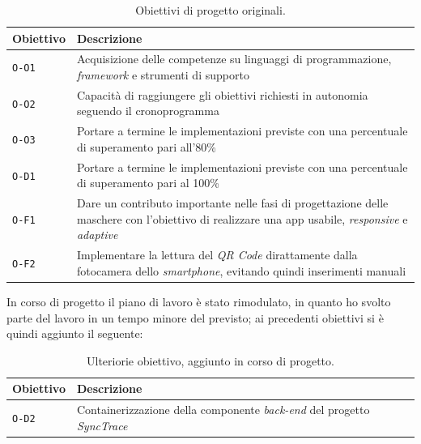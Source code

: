 \begin{table}[h]
\begin{tabularx}{\textwidth}{|l|X|}
\hline
\textbf{Obiettivo}           & \textbf{Descrizione}                                                                                                                          \\ \hline
\texttt{O-O1} & Acquisizione delle competenze su linguaggi di programmazione, \textit{framework} e strumenti di supporto                                              \\ \hline
\texttt{O-O2} & Capacità di raggiungere gli obiettivi richiesti in autonomia seguendo il cronoprogramma                                                       \\ \hline
\texttt{O-O3} & Portare a termine le implementazioni previste con una percentuale di superamento pari all'80\%                                                \\ \hline
\texttt{O-D1} & Portare a termine le implementazioni previste con una percentuale di superamento pari al 100\%                                                \\ \hline
\texttt{O-F1} & Dare un contributo importante nelle fasi di progettazione delle maschere con l'obiettivo di realizzare una app usabile, \textit{responsive} e \textit{adaptive} \\ \hline
\texttt{O-F2} & Implementare la lettura del \textit{QR Code} dirattamente dalla fotocamera dello \textit{smartphone}, evitando quindi inserimenti manuali                       \\ \hline
\end{tabularx}
\caption{Obiettivi di progetto originali.}
\end{table}

In corso di progetto il piano di lavoro è stato rimodulato, in quanto ho svolto parte del lavoro in un tempo minore del previsto; ai precedenti obiettivi si è quindi aggiunto il seguente:

\begin{table}[h]
\begin{tabularx}{\textwidth}{|l|X|}
\hline
\textbf{Obiettivo}           & \textbf{Descrizione}                                                                                                                          \\ \hline
\texttt{O-D2} & Containerizzazione della componente \textit{back-end} del progetto \textit{SyncTrace}                                              \\ \hline
\end{tabularx}
\caption{Ulteriorie obiettivo, aggiunto in corso di progetto.}
\end{table}


